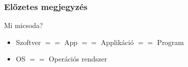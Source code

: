 \begin{frame}
\frametitle{Előzetes megjegyzés}

\begin{alertblock}{Mi micsoda?}
	\begin{itemize}
		\item Szoftver $==$ App $==$ Applikáció $==$ Program
		\item OS $==$ Operációs rendszer
	\end{itemize}
\end{alertblock}

\end{frame}